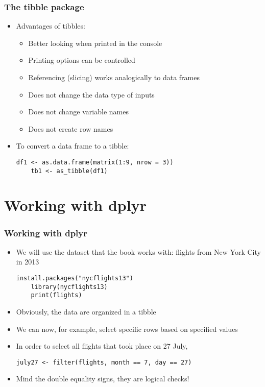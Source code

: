 \documentclass[10pt]{beamer}
\theoremstyle{definition}
\begin{document}
\begin{frame}[fragile]
\frametitle{The \textbf{tibble} package}
\begin{itemize}
	\item Advantages of tibbles: 
	\begin{itemize}
		\item Better looking when printed in the console
		\item Printing options can be controlled
		\item Referencing (slicing) works analogically to data frames
		\item Does not change the data type of inputs
		\item Does not change variable names
		\item Does not create row names
	\end{itemize}
	\item To convert a data frame to a tibble:
	\begin{lstlisting}[style = rstyle, breaklines]
	df1 <- as.data.frame(matrix(1:9, nrow = 3))	
	tb1 <- as_tibble(df1)
	\end{lstlisting}
\end{itemize}
\end{frame}

\section{Working with \textbf{dplyr}}
\begin{frame}[fragile]
\frametitle{Working with \textbf{dplyr}}
\begin{itemize}
	\item We will use the dataset that the book works with: flights from New York City in 2013
	\begin{lstlisting}[style = rstyle, breaklines]
	install.packages("nycflights13")
	library(nycflights13)
	print(flights)
	\end{lstlisting}
	\item Obviously, the data are organized in a tibble
	\item We can now, for example, select specific rows based on specified values
	\item In order to select all flights that took place on 27 July,
	\begin{lstlisting}[style = rstyle, breaklines]
	july27 <- filter(flights, month == 7, day == 27)	
	\end{lstlisting}
	\item Mind the double equality signs, they are logical checks!
\end{itemize}
\end{frame}
\end{document}
